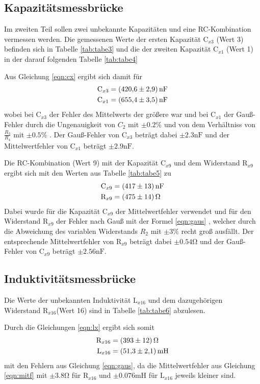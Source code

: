 \subsection{Kapazitätsmessbrücke}
Im zweiten Teil sollen zwei unbekannte Kapazitäten und eine RC-Kombination
vermessen werden. Die gemessenen Werte der ersten Kapazität $ \text{C}_{x3} $ (Wert 3) befinden
sich in Tabelle \ref{tab:tabe3} und die der zweiten Kapazität $ \text{C}_{x1} $
(Wert 1) in der
darauf folgenden Tabelle \ref{tab:tabe4}


\noindent Aus Gleichung \ref{eqn:cx}
ergibt sich damit für
\begin{align*}
  \text{C}_{x3} &= \SI{420.6 (29)}{\nano\farad} \\
  \text{C}_{x1} &= \SI{655.4 (35)}{\nano\farad}
\end{align*}
wobei bei $ \text{C}_{x3} $ der Fehler des Mittelwerts der größere war und bei
$ \text{C}_{x1} $ der Gauß-Fehler durch die Ungenauigkeit von $C_2$ mit $ \pm 0.2
\% $ und von dem Verhältniss von $ \frac{R_3}{R_4} $ mit $ \pm 0.5 \% $ .
Der Gauß-Fehler von $ \text{C}_{x3} $ beträgt
dabei $ \pm 2.3 \si{\nano\farad} $ und der Mittelwertfehler von $ \text{C}_{x1} $
beträgt $ \pm 2.9 \si{\nano\farad} $.


\noindent Die RC-Kombination (Wert 9) mit der Kapazität $ \text{C}_{x9} $ und dem
Widerstand $ \text{R}_{x9} $ ergibt sich
mit den Werten aus Tabelle \ref{tab:tabe5} zu
\begin{align*}
  \text{C}_{x9} &= \SI{417 (13)}{\nano\farad} \\
  \text{R}_{x9} &= \SI{475 (14)}{\ohm}
\end{align*}
Dabei wurde für die Kapazität $ \text{C}_{x9} $ der Mittelwertfehler verwendet und
für den Widerstand $ \text{R}_{x9} $ der Fehler nach Gauß mit der Formel \ref{eqn:gaus}
, welcher durch die Abweichung des variablen Widerstands $R_2$ mit $ \pm 3 \% $
recht groß ausfällt. Der entsprechende Mittelwertfehler von $ \text{R}_{x9} $
beträgt dabei $ \pm 0.54 \si{\ohm} $ und der Gauß-Fehler von $ \text{C}_{x9} $ beträgt
$ \pm 2.56 \si{\nano\farad} $.


\subsection{Induktivitätsmessbrücke}

Die Werte der unbekannten Induktivität $ \text{L}_{x16} $ und dem dazugehörigen
Widerstand $ \text{R}_{x16} $(Wert 16) sind in Tabelle
\ref{tab:tabe6} abzulesen.

Durch die Gleichungen \ref{eqn:lx}
ergibt sich somit
\begin{align*}
  \text{R}_{x16} &= \SI{393 (12)}{\ohm} \\
  \text{L}_{x16} &= \SI{51.3 (21)}{\milli\henry}
\end{align*}
mit den Fehlern aus Gleichung \ref{eqn:gaus}, da die Mittelwertfehler aus Gleichung
\ref{eqn:mitf} mit
$ \pm 3.8 \si{\ohm} $ für $ \text{R}_{x16} $ und $ \pm 0.076 \si{\milli\henry} $
für $ \text{L}_{x16} $ jeweils kleiner sind.

